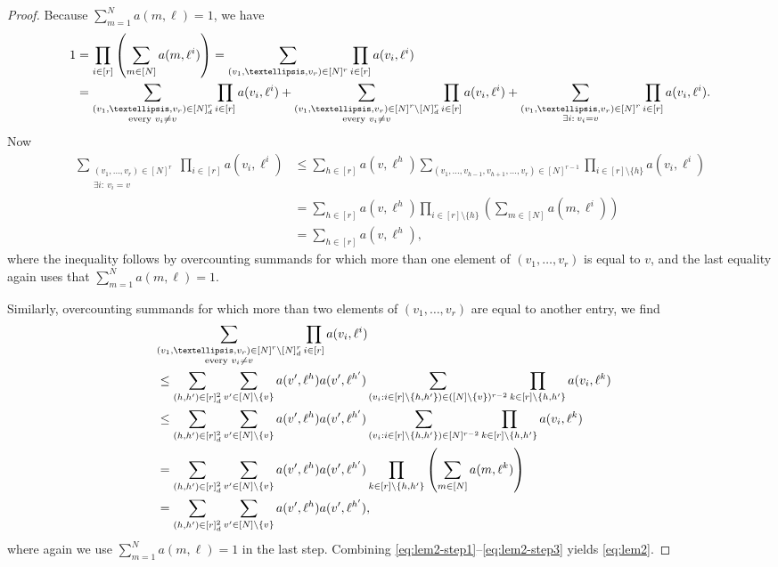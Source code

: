 \documentclass[a4paper,11pt]{article}
\theoremstyle{definition}
\begin{document}
\begin{proof}
Because $\sum_{ m = 1 }^N a( m, \ell ) = 1$, we have
\begin{align}
1 &= \prod_{i\in [r]}\left(\sum_{m \in [N]} a(m,\ell^i)\right) = \sum_{ (v_1,\dots,v_r) \in [ N ]^r} \prod_{i\in [r]} a(v_i,\ell^i) \notag\\
&= \sum_{ \substack{ ( v_1, \ldots, v_r ) \in [ N ]_d^r \\ \text{every } v_i \neq v } } \prod_{i\in [r]} a(v_i,\ell^i) + \sum_{ \substack{ ( v_1, \ldots, v_r ) \in [ N ]^r\setminus [N]^r_d \\ \text{every } v_i \neq v }} \prod_{i\in [r]} a(v_i,\ell^i)   + \sum_{ \substack{ ( v_1, \ldots, v_r ) \in [ N ]^r \\ \exists i:\: v_i = v }} \prod_{i\in [r]} a(v_i,\ell^i). \label{eq:lem2-step1}
\end{align}
Now
\begin{align*}
\sum_{ \substack{ ( v_1, \ldots, v_r ) \in [ N ]^r \\ \exists i:\: v_i = v }}  \prod_{i\in [r]} a(v_i,\ell^i) &\leq \sum_{h\in[r]} a(v,\ell^h)\sum_{ (v_1,\dots,v_{h-1},v_{h+1},\dots,v_{r}) \in [N]^{r-1}}  \prod_{i\in [r]\setminus \{h\}} a(v_i,\ell^i) \\
&=  \sum_{h\in[r]} a(v,\ell^h) \prod_{i\in[r]\setminus\{h\}} \left(\sum_{m\in[N]} a(m,\ell^i) \right) \\
&= \sum_{h\in[r]} a(v,\ell^h), 
\end{align*}
where the inequality follows by overcounting summands for which more than one element of $(v_1,\dots,v_r)$ is equal to $v$, and the last equality again uses that $\sum_{ m = 1 }^N a( m, \ell ) = 1$.

Similarly, overcounting summands for which more than two elements of $(v_1,\dots,v_r)$ are equal to another entry, we find
\begin{align}
\lefteqn{\sum_{ \substack{ ( v_1, \ldots, v_r ) \in [ N ]^r\setminus [N]^r_d \\ \text{every } v_i \neq v }} \prod_{i\in [r]} a(v_i,\ell^i)} \notag\\
&\leq \sum_{(h,h')\in[r]_d^2} \sum_{v'\in[N]\setminus\{v\}} a(v',\ell^h)a(v',\ell^{h'}) \sum_{( v_i : i \in [r] \setminus \{h, h' \}) \in ([N]\setminus\{v\})^{r-2}} \prod_{k\in[r]\setminus\{h,h'\}} a(v_i,\ell^k) \notag\\
&\leq \sum_{(h,h')\in[r]_d^2} \sum_{v'\in[N]\setminus\{v\}} a(v',\ell^h)a(v',\ell^{h'}) \sum_{( v_i : i \in [r] \setminus \{h,h' \}) \in [N]^{r-2}} \prod_{k\in[r]\setminus\{h,h'\}} a(v_i,\ell^k) \notag\\
&= \sum_{(h,h')\in[r]_d^2} \sum_{v'\in[N]\setminus\{v\}} a(v',\ell^h)a(v',\ell^{h'}) \prod_{k\in[r]\setminus\{h,h'\}} \left(\sum_{m\in [N]} a(m,\ell^k)\right) \notag\\
&= \sum_{(h,h')\in[r]_d^2} \sum_{v'\in[N]\setminus\{v\}} a(v',\ell^h)a(v',\ell^{h'}), \label{eq:lem2-step3}
\end{align}
where again we use $\sum_{ m = 1 }^N a( m, \ell ) = 1$ in the last step.
Combining \eqref{eq:lem2-step1}--\eqref{eq:lem2-step3} yields \eqref{eq:lem2}.
\end{proof}
\end{document}

